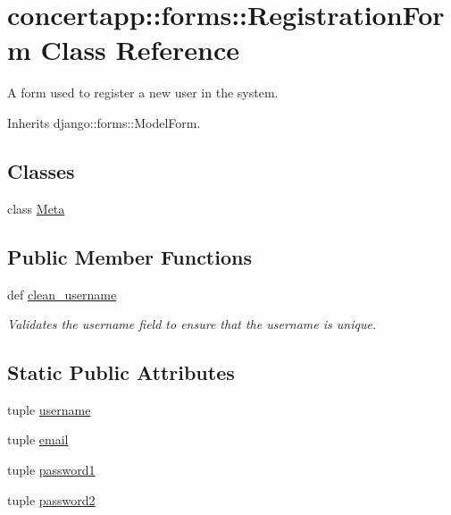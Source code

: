 \hypertarget{classconcertapp_1_1forms_1_1_registration_form}{
\section{concertapp::forms::RegistrationForm Class Reference}
\label{classconcertapp_1_1forms_1_1_registration_form}
}


A form used to register a new user in the system.  




Inherits django::forms::ModelForm.

\subsection*{Classes}
\begin{DoxyCompactItemize}
\item 
class \hyperlink{classconcertapp_1_1forms_1_1_registration_form_1_1_meta}{Meta}
\end{DoxyCompactItemize}
\subsection*{Public Member Functions}
\begin{DoxyCompactItemize}
\item 
def \hyperlink{classconcertapp_1_1forms_1_1_registration_form_a3d2dfd38425ecb55eb6578cf59235f9a}{clean\_\-username}
\begin{DoxyCompactList}\small\item\em Validates the username field to ensure that the username is unique. \item\end{DoxyCompactList}\end{DoxyCompactItemize}
\subsection*{Static Public Attributes}
\begin{DoxyCompactItemize}
\item 
tuple \hyperlink{classconcertapp_1_1forms_1_1_registration_form_a1feae87227acf1bab84f794ddd92f9bc}{username}
\item 
tuple \hyperlink{classconcertapp_1_1forms_1_1_registration_form_ae7e72047b1f454db6f5c9c7232dc67b9}{email}
\item 
tuple \hyperlink{classconcertapp_1_1forms_1_1_registration_form_a9db2b1df2aa51ed583d6d29d1d9b23ad}{password1}
\item 
tuple \hyperlink{classconcertapp_1_1forms_1_1_registration_form_afa9b67cdb3d9db3e8c2d7899cc399d5c}{password2}
\end{DoxyCompactItemize}


